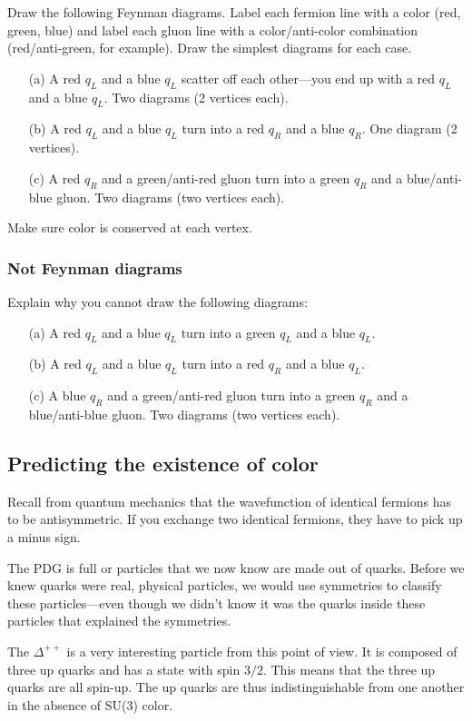 \documentclass[12pt]{article}
\begin{document}
Draw the following Feynman diagrams. Label each fermion line with a color (red, green, blue) and label each gluon line with a color/anti-color combination (red/anti-green, for example).  Draw the simplest diagrams for each case.
\begin{enumerate}
	\item[(a)] A red $q_L$ and a blue $q_L$ scatter off each other---you end up with a red $q_L$ and a blue $q_L$. Two diagrams (2 vertices each). 
	\item[(b)] A red $q_L$ and a blue $q_L$ turn into a red $q_R$ and a blue $q_R$. One diagram (2 vertices). 
	\item[(c)] A red $q_R$ and a green/anti-red gluon turn into a green $q_R$ and  a blue/anti-blue gluon. Two diagrams (two vertices each). 
\end{enumerate}
Make sure color is conserved at each vertex.


\subsubsection{Not Feynman diagrams}

Explain why you cannot draw the following diagrams:
\begin{enumerate}
	\item[(a)] A red $q_L$ and a blue $q_L$ turn into a green $q_L$ and a blue $q_L$. 
	\item[(b)] A red $q_L$ and a blue $q_L$ turn into a red $q_R$ and a blue $q_L$. 
	\item[(c)] A blue $q_R$ and a green/anti-red gluon turn into a green $q_R$ and a blue/anti-blue gluon. Two diagrams (two vertices each). 
\end{enumerate}


\subsection{Predicting the existence of color}

Recall from quantum mechanics that the wavefunction of identical fermions has to be antisymmetric. If you exchange two identical fermions, they have to pick up a minus sign. 

The PDG is full or particles that we now know are made out of quarks. Before we knew quarks were real, physical particles, we would use symmetries to classify these particles---even though we didn't know it was the quarks inside these particles that explained the symmetries. 

The $\Delta^{++}$ is a very interesting particle from this point of view. It is composed of three up quarks and has a state with spin $3/2$. This means that the three up quarks are all spin-up. The up quarks are thus indistinguishable from one another in the absence of SU(3) color.
\end{document}
